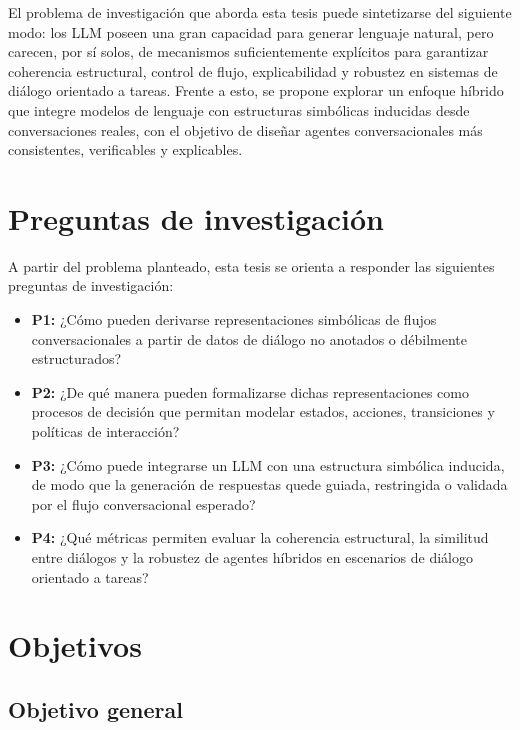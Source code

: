 El problema de investigación que aborda esta tesis puede sintetizarse del siguiente
modo: los \ac{LLM} poseen una gran capacidad para generar lenguaje natural, pero carecen,
por sí solos, de mecanismos suficientemente explícitos para garantizar coherencia
estructural, control de flujo, explicabilidad y robustez en sistemas de diálogo orientado
a tareas. Frente a esto, se propone explorar un enfoque híbrido que integre modelos de
lenguaje con estructuras simbólicas inducidas desde conversaciones reales, con el objetivo
de diseñar agentes conversacionales más consistentes, verificables y explicables.

\section{Preguntas de investigación}

A partir del problema planteado, esta tesis se orienta a responder las siguientes
preguntas de investigación:

\begin{itemize}
\item \textbf{P1:} ¿Cómo pueden derivarse representaciones simbólicas de flujos
conversacionales a partir de datos de diálogo no anotados o débilmente estructurados?

\item \textbf{P2:} ¿De qué manera pueden formalizarse dichas representaciones como
procesos de decisión que permitan modelar estados, acciones, transiciones y políticas
de interacción?

\item \textbf{P3:} ¿Cómo puede integrarse un \ac{LLM} con una estructura simbólica
inducida, de modo que la generación de respuestas quede guiada, restringida o
validada por el flujo conversacional esperado?

\item \textbf{P4:} ¿Qué métricas permiten evaluar la coherencia estructural, la similitud
entre diálogos y la robustez de agentes híbridos en escenarios de diálogo orientado
a tareas?
\end{itemize}

\section{Objetivos}

\subsection{Objetivo general}

